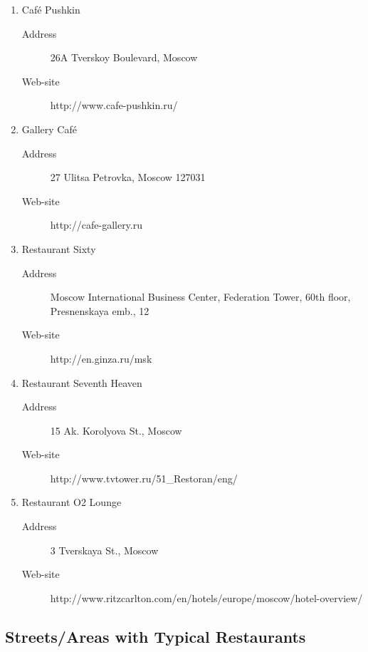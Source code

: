 \documentclass[10pt,fleqn,openany]{book} %
\begin{document}
\begin{enumerate}
	
	\item Café Pushkin 
		\begin{description}
			\item[Address] 26A Tverskoy Boulevard, Moscow
			\item[Web-site] http://www.cafe-pushkin.ru/
		\end{description}
	
	\item Gallery Café
		\begin{description}
			\item[Address] 27 Ulitsa Petrovka, Moscow 127031
			\item[Web-site] http://cafe-gallery.ru
		\end{description}
	
	\item Restaurant Sixty
		\begin{description}
			\item[Address] Moscow International Business Center, Federation Tower, 60th floor, Presnenskaya emb., 12
			\item[Web-site] http://en.ginza.ru/msk
		\end{description}

	\item Restaurant Seventh Heaven 
		\begin{description}
			\item[Address] 15 Ak. Korolyova St., Moscow 
			\item[Web-site] http://www.tvtower.ru/51\_Restoran/eng/ 
		\end{description}

	\item Restaurant O2 Lounge
		\begin{description}
			\item[Address] 3 Tverskaya St., Moscow 
			\item[Web-site] http://www.ritzcarlton.com/en/hotels/europe/moscow/hotel-overview/
		\end{description}
	
\end{enumerate}

\subsection{Streets/Areas with Typical Restaurants}
\end{document}

